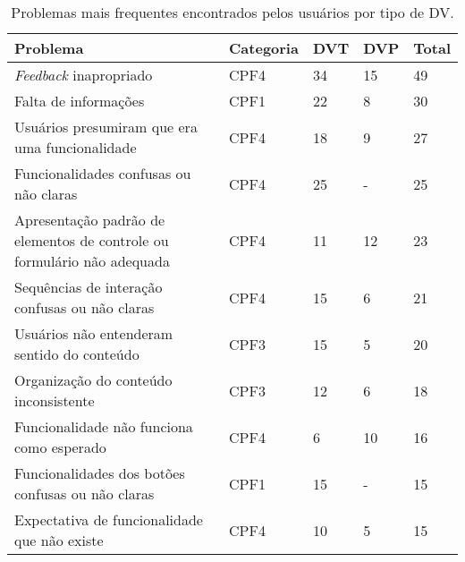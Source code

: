 \begin{table}[htb]
  \begin{center}
    \ABNTEXfontereduzida
    \caption{Problemas mais frequentes encontrados pelos usuários por tipo de DV.}
    \label{tab-pro-blind-1}
    \begin{tabular}{p{10.5cm}|p{1.4cm}|p{0.6cm}|p{0.6cm}|p{0.7cm}}
      \textbf{Problema}                                                       & \textbf{Categoria} & \textbf{DVT} & \textbf{DVP} & \textbf{Total} \\
      \hline
      \emph{Feedback} inapropriado                                            & CPF4               & 34           & 15           & 49             \\
      \hline
      Falta de informações                                                    & CPF1               & 22           & 8            & 30             \\
      \hline
      Usuários presumiram que era uma funcionalidade                          & CPF4               & 18           & 9            & 27             \\
      \hline
      Funcionalidades confusas ou não claras                                  & CPF4               & 25           & -            & 25             \\
      \hline
      Apresentação padrão de elementos de controle ou formulário não adequada & CPF4               & 11           & 12           & 23             \\
      \hline
      Sequências de interação confusas ou não claras                          & CPF4               & 15           & 6            & 21             \\
      \hline
      Usuários não entenderam sentido do conteúdo                             & CPF3               & 15           & 5            & 20             \\
      \hline
      Organização do conteúdo inconsistente                                   & CPF3               & 12           & 6            & 18             \\
      \hline
      Funcionalidade não funciona como esperado                               & CPF4               & 6            & 10           & 16             \\
      \hline
      Funcionalidades dos botões confusas ou não claras                       & CPF1               & 15           & -            & 15             \\
      \hline
      Expectativa de funcionalidade que não existe                            & CPF4               & 10           & 5            & 15             \\

\end{tabular}
\end{center}
\end{table}
